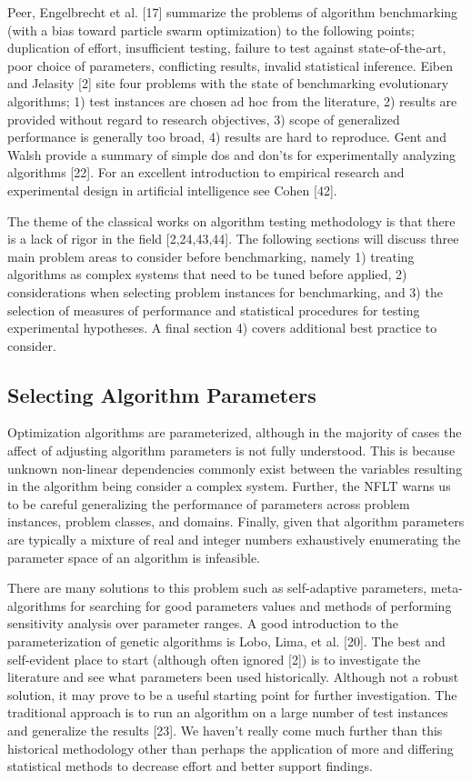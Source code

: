 \documentclass[a4paper, 11pt]{article}
\begin{document}
Peer, Engelbrecht et al. [17] summarize the problems of algorithm benchmarking (with a bias toward particle swarm optimization) to the following points; duplication of effort, insufficient testing, failure to test against state-of-the-art, poor choice of parameters, conflicting results, invalid statistical inference. Eiben and Jelasity [2] site four problems with the state of benchmarking evolutionary algorithms; 1) test instances are chosen ad hoc from the literature, 2) results are provided without regard to research objectives, 3) scope of generalized performance is generally too broad, 4) results are hard to reproduce.
Gent and Walsh provide a summary of simple dos and don'ts for experimentally analyzing algorithms [22]. For an excellent introduction to empirical research and experimental design in artificial intelligence see Cohen [42].

The theme of the classical works on algorithm testing methodology is that there is a lack of rigor in the field [2,24,43,44]. The following sections will discuss three main problem areas to consider before benchmarking, namely 1) treating algorithms as complex systems that need to be tuned before applied, 2) considerations when selecting problem instances for benchmarking, and 3) the selection of measures of performance and statistical procedures for testing experimental hypotheses. A final section 4) covers additional best practice to consider.


% 
% 
\subsection{Selecting Algorithm Parameters}
Optimization algorithms are parameterized, although in the majority of cases the affect of adjusting algorithm parameters is not fully understood. This is because unknown non-linear dependencies commonly exist between the variables resulting in the algorithm being consider a complex system. Further, the NFLT warns us to be careful generalizing the performance of parameters across problem instances, problem classes, and domains. Finally, given that algorithm parameters are typically a mixture of real and integer numbers exhaustively enumerating the parameter space of an algorithm is infeasible.

There are many solutions to this problem such as self-adaptive parameters, meta-algorithms for searching for good parameters values and methods of performing sensitivity analysis over parameter ranges. A good introduction to the parameterization of genetic algorithms is Lobo, Lima, et al. [20]. The best and self-evident place to start (although often ignored [2]) is to investigate the literature and see what parameters been used historically. Although not a robust solution, it may prove to be a useful starting point for further investigation. The traditional approach is to run an algorithm on a large number of test instances and generalize the results [23]. We haven't really come much further than this historical methodology other than perhaps the application of more and differing statistical methods to decrease effort and better support findings.
\end{document}
